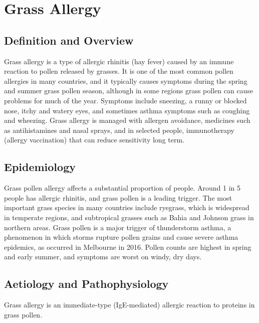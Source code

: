 \chapter{Grass Allergy}

\section*{Definition and Overview}
Grass allergy is a type of allergic rhinitis (hay fever) caused by an immune reaction to pollen released by grasses. It is one of the most common pollen allergies in many countries, and it typically causes symptoms during the spring and summer grass pollen season, although in some regions grass pollen can cause problems for much of the year. Symptoms include sneezing, a runny or blocked nose, itchy and watery eyes, and sometimes asthma symptoms such as coughing and wheezing. Grass allergy is managed with allergen avoidance, medicines such as antihistamines and nasal sprays, and in selected people, immunotherapy (allergy vaccination) that can reduce sensitivity long term.

\section*{Epidemiology}
Grass pollen allergy affects a substantial proportion of people. Around 1 in 5 people has allergic rhinitis, and grass pollen is a leading trigger. The most important grass species in many countries include ryegrass, which is widespread in temperate regions, and subtropical grasses such as Bahia and Johnson grass in northern areas. Grass pollen is a major trigger of thunderstorm asthma, a phenomenon in which storms rupture pollen grains and cause severe asthma epidemics, as occurred in Melbourne in 2016. Pollen counts are highest in spring and early summer, and symptoms are worst on windy, dry days.

\section*{Aetiology and Pathophysiology}
Grass allergy is an immediate-type (IgE-mediated) allergic reaction to proteins in grass pollen.

